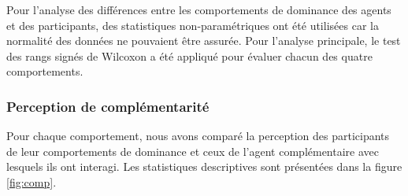 	Pour l'analyse des différences entre les comportements de dominance des agents et des participants, des statistiques non-paramétriques ont été utilisées car la normalité des données ne pouvaient être assurée. Pour l'analyse principale, le test des rangs signés de Wilcoxon a été appliqué pour évaluer chacun des quatre comportements.
	
	\subsubsection{Perception de complémentarité}
	
	Pour chaque comportement, nous avons comparé la perception des participants de leur comportements de dominance et ceux de l'agent complémentaire avec lesquels ils ont interagi. Les statistiques descriptives sont présentées dans la figure \ref{fig:comp}. 
	
